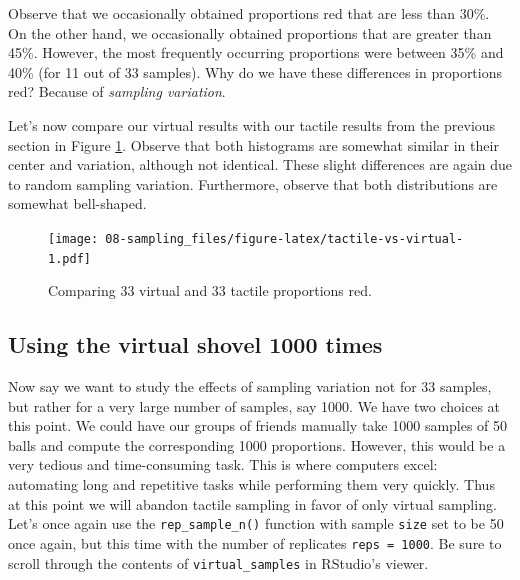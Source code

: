 \documentclass[
]{book}
\newenvironment{Shaded}{\begin{snugshade}}{\end{snugshade}}
\newcommand{\DataTypeTok}[1]{\textcolor[rgb]{0.13,0.29,0.53}{#1}}
\newcommand{\DecValTok}[1]{\textcolor[rgb]{0.00,0.00,0.81}{#1}}
\newcommand{\KeywordTok}[1]{\textcolor[rgb]{0.13,0.29,0.53}{\textbf{#1}}}
\newcommand{\NormalTok}[1]{#1}
\newcommand{\OperatorTok}[1]{\textcolor[rgb]{0.81,0.36,0.00}{\textbf{#1}}}
\newcommand{\StringTok}[1]{\textcolor[rgb]{0.31,0.60,0.02}{#1}}
\begin{document}
Observe that we occasionally obtained proportions red that are less than 30\%. On the other hand, we occasionally obtained proportions that are greater than 45\%. However, the most frequently occurring proportions were between 35\% and 40\% (for 11 out of 33 samples). Why do we have these differences in proportions red? Because of \emph{sampling variation}.

Let's now compare our virtual results with our tactile results from the previous section in Figure \ref{fig:tactile-vs-virtual}. Observe that both histograms are somewhat similar in their center and variation, although not identical. These slight differences are again due to random sampling variation. Furthermore, observe that both distributions are somewhat bell-shaped.

\begin{figure}
\centering
\texttt{[image: 08-sampling\_files/figure-latex/tactile-vs-virtual-1.pdf]}
\caption{\label{fig:tactile-vs-virtual}Comparing 33 virtual and 33 tactile proportions red.}
\end{figure}

\hypertarget{shovel-1000-times}{%
\subsection{Using the virtual shovel 1000 times}\label{shovel-1000-times}}

Now say we want to study the effects of sampling variation not for 33 samples, but rather for a very large number of samples, say 1000. We have two choices at this point. We could have our groups of friends manually take 1000 samples of 50 balls and compute the corresponding 1000 proportions. However, this would be a very tedious and time-consuming task. This is where computers excel: automating long and repetitive tasks while performing them very quickly. Thus at this point we will abandon tactile sampling in favor of only virtual sampling. Let's once again use the \texttt{rep\_sample\_n()} function with sample \texttt{size} set to be 50 once again, but this time with the number of replicates \texttt{reps\ =\ 1000}. Be sure to scroll through the contents of \texttt{virtual\_samples} in RStudio's viewer.

\begin{Shaded}
\end{Shaded}
\end{document}
